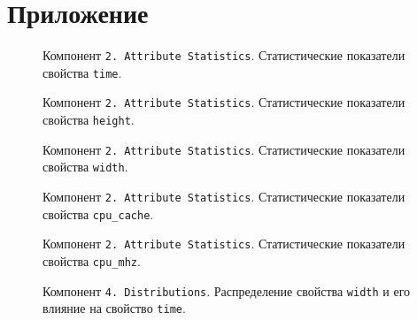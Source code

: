 \section*{Приложение}
%

\begin{figure}[H]
    \caption{Компонент \texttt{2.\,Attribute~Statistics}. Статистические показатели свойства \texttt{time}.}
    \label{img:2-Attribute-Statistics-time}
\end{figure}

\begin{figure}[H]
    \caption{Компонент \texttt{2.\,Attribute~Statistics}. Статистические показатели свойства \texttt{height}.}
    \label{img:2-Attribute-Statistics-height}
\end{figure}

\begin{figure}[H]
    \caption{Компонент \texttt{2.\,Attribute~Statistics}. Статистические показатели свойства \texttt{width}.}
    \label{img:2-Attribute-Statistics-width}
\end{figure}

\begin{figure}[H]
    \caption{Компонент \texttt{2.\,Attribute~Statistics}. Статистические показатели свойства \texttt{cpu_cache}.}
    \label{img:2-Attribute-Statistics-cpu_cache}
\end{figure}

\begin{figure}[H]
    \caption{Компонент \texttt{2.\,Attribute~Statistics}. Статистические показатели свойства \texttt{cpu_mhz}.}
    \label{img:2-Attribute-Statistics-cpu_mhz}
\end{figure}

\begin{figure}[H]
    \caption{Компонент \texttt{4.\,Distributions}. Распределение свойства \texttt{width} и его влияние на свойство \texttt{time}.}
    \label{img:4-Distributions-width}
\end{figure}

